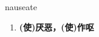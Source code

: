 
\begin{frame}
{\huge nauseate}
\begin{center}
\begin{enumerate}\Large
  \item \textbf{(使)厌恶，(使)作呕}
\end{enumerate}
\end{center}
\end{frame}
